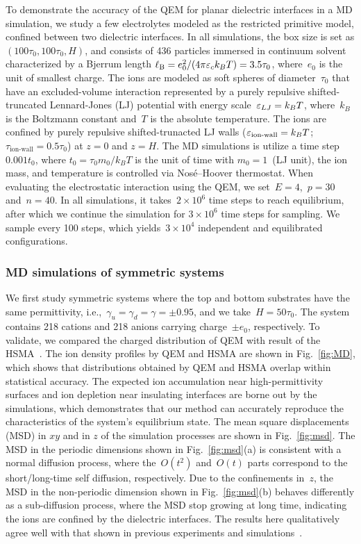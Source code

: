 To demonstrate the accuracy of the QEM for planar dielectric interfaces in a MD simulation, we study a few electrolytes modeled as the restricted primitive model, confined between two dielectric interfaces.
In all simulations, the box size is set as $(100 \tau_0, 100\tau_0, H)$, and consists of 436 particles immersed in continuum solvent characterized by a Bjerrum length $\ell_{\mathrm B} = e_0^2/(4 \pi \varepsilon_c k_B T) = 3.5 \tau_0$, where~$e_0$ is the unit of smallest charge.
The ions are modeled as soft spheres of diameter~$\tau_0$ that have an excluded-volume interaction represented by a purely repulsive shifted-truncated Lennard-Jones (LJ) potential with energy scale~$\varepsilon_{LJ} = k_B T$, where~$k_B$ is the Boltzmann constant and~$T$ is the absolute temperature.
The ions are confined by purely repulsive shifted-trunacted LJ walls ($\varepsilon_\text{ion-wall} = k_B T$; $\tau_\text{ion-wall} = 0.5 \tau_0$) at $z = 0$ and $z = H$. 
The MD simulations is utilize a time step $0.001 t_0$, where $t_0 = \tau_0 m_0 / k_B T$ is the unit of time with $m_0 = 1$~(LJ unit), the ion mass, and temperature is controlled via Nosé–Hoover thermostat.
When evaluating the electrostatic interaction using the QEM, we set~$E = 4$,~$p = 30$ and~$n = 40$.
In all simulations, it takes~$2 \times 10^6$ time steps to reach equilibrium, after which we continue the simulation for $3 \times 10^6$ time steps for sampling.
We sample every 100 steps, which yields~$3 \times 10^{4}$ independent and equilibrated configurations.

\subsubsection{MD simulations of symmetric systems}

We first study symmetric systems where the top and bottom substrates have the same permittivity, i.e.,~$\gamma_u = \gamma_d = \gamma = \pm 0.95$, and we take~$H = 50 \tau_0$.
The system contains 218 cations and 218 anions carrying charge~$\pm e_0$, respectively.
To validate, we compared the charged distribution of QEM with result of the HSMA~\cite{liang2020harmonic}.
The ion density profiles by QEM and HSMA are shown in Fig.~\ref{fig:MD}, which shows that distributions obtained by QEM and HSMA overlap within statistical accuracy. 
The expected ion accumulation near high-permittivity surfaces and ion depletion near insulating interfaces are borne out by the simulations, which demonstrates that our method can accurately reproduce the characteristics of the system's equilibrium state.
The mean square displacements (MSD) in $xy$ and in $z$ of the simulation processes are shown in Fig.~\ref{fig:msd}.
The MSD in the periodic dimensions shown in Fig.~\ref{fig:msd}(a) is consistent with a normal diffusion process, where the~$O(t^2)$ and~$O(t)$ parts correspond to the short/long-time self diffusion, respectively.
Due to the confinements in~$z$, the MSD in the non-periodic dimension shown in Fig.~\ref{fig:msd}(b) behaves differently as a sub-diffusion process, where the MSD stop growing at long time, indicating the ions are confined by the dielectric interfaces.
The results here qualitatively agree well with that shown in previous experiments and simulations~\cite{das2010single, neusius2009subdiffusion}.

